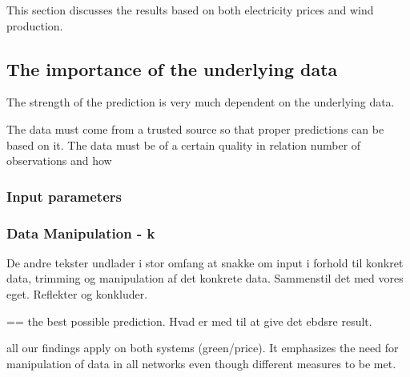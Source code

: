 This section discusses the results based on both electricity prices and wind production.

\subsection{The importance of the underlying data}
The strength of the prediction is very much dependent on the underlying data.  

The data must come from a trusted source so that proper predictions can be based on it. The data must be of a certain quality in relation number of observations and how  

\subsubsection{Input parameters}

\subsubsection{Data Manipulation - k}
De andre tekster undlader i stor omfang at snakke om input i forhold til konkret data, trimming og manipulation af det konkrete data. Sammenstil det med vores eget. Reflekter og konkluder.

== the best possible prediction. Hvad er med til at give det ebdsre result.

all our findings apply on both systems (green/price). It emphasizes the need for manipulation of data in all networks even though different measures to be met.

